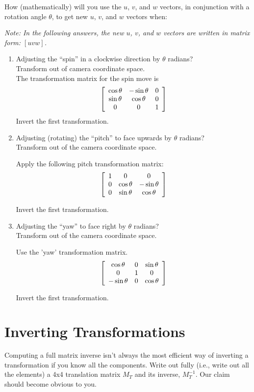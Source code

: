 \documentclass[10pt,twocolumn]{article}
\begin{document}
\begin{framed}
\noindent {\bf [1/2 pt. each]} How (mathematically) will you use the $u$, $v$, and $w$ vectors, in conjunction with a rotation angle $\theta$, to get new $u$, $v$, and $w$ vectors when:

\textit{Note: In the following answers, the new $u$, $v$, and $w$ vectors are
written in matrix form: $\left[u v w \right]$.}
\begin{enumerate}
\item Adjusting the ``spin'' in a clockwise direction by $\theta$ radians? \\
Transform out of camera coordinate space. \\
The transformation matrix for the spin move is
\[ \left[
\begin{array}{c c c}
\cos{\theta} & -\sin \theta & 0 \\
\sin{\theta} & \cos \theta & 0 \\
0 & 0 & 1
\end{array}
\right] \]
Invert the first transformation.
\item Adjusting (rotating) the ``pitch'' to face upwards by $\theta$ radians?\\
Transform out of the camera coordinate space.

Apply the following pitch transformation matrix:
\[ \left[
\begin{array}{c c c}
1 & 0 & 0\\
0 & \cos \theta & -\sin \theta\\
0 & \sin \theta & \cos \theta
\end{array}
\right] \]

Invert the first transformation.
\item Adjusting the ``yaw'' to face right by $\theta$ radians?\\
Transform out of the camera coordinate space.

Use the 'yaw' transformation matrix.
\[ \left[
\begin{array}{c c c}
\cos{\theta} & 0 & \sin \theta \\
0 & 1 & 0 \\
-\sin{\theta} & 0 & \cos \theta
\end{array}
\right] \]

Invert the first transformation.
\end{enumerate}
\end{framed}

\section{Inverting Transformations}
\begin{framed}
\noindent {\bf [1 point]} Computing a full matrix inverse isn't always the most efficient way of inverting a transformation if you know all the components. Write out fully (i.e., write out all the elements) a 4x4 translation matrix $M_T$ and its inverse, $M^{-1}_T$. Our claim should become obvious to you.
\end{framed}
\end{document}
